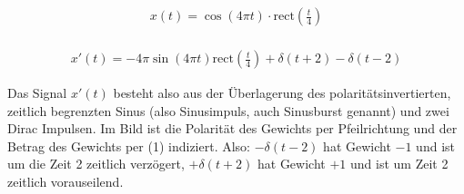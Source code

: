 \begin{Loesung}

\begin{align}
x(t) = \cos(4\pi t) \cdot \mathrm{rect}(\frac{t}{4})\\
\end{align}

\begin{align}x'(t)=
- 4\pi\sin(4\pi t) \mathrm{rect}(\frac{t}{4})
+ \delta(t+2)
- \delta(t-2)
\end{align}

\begin{center}
\end{center}

Das Signal $x'(t)$ besteht also aus der Überlagerung des polaritätsinvertierten,
zeitlich begrenzten Sinus (also Sinusimpuls, auch
Sinusburst genannt) und zwei Dirac Impulsen. Im Bild ist die
Polarität des Gewichts per Pfeilrichtung und der Betrag des Gewichts per (1)
indiziert. Also: $-\delta(t-2)$ hat Gewicht $-1$ und ist um die Zeit 2 zeitlich
verzögert,
$+\delta(t+2)$ hat Gewicht $+1$ und ist um Zeit 2 zeitlich vorauseilend.
\end{Loesung}





\newpage
